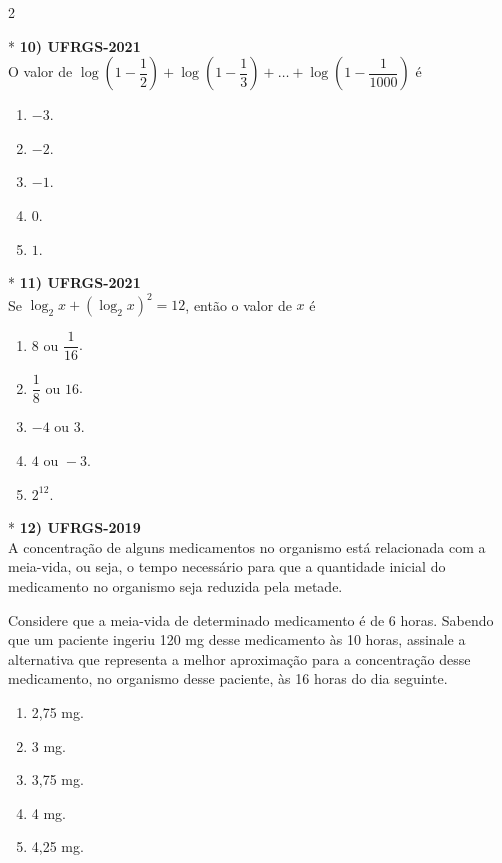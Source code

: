 \documentclass[11pt,a4paper]{article}
\begin{document}
\begin{paracol}{2}
\switchcolumn[1]
\vspace{6cm}

\switchcolumn[0]*
\textbf{10) UFRGS-2021} \\
O valor de $\log\left(1 - \dfrac{1}{2}\right) + \log\left(1 - \dfrac{1}{3}\right) + \dots + \log\left(1 - \dfrac{1}{1000}\right)$ é

\begin{enumerate}[label=(\Alph*)]
    \item $-3$.
    \item $-2$.
    \item $-1$.
    \item $0$.
    \item $1$.
\end{enumerate}
\vspace{0.4cm}

\switchcolumn[1]
\vspace{6cm}

\switchcolumn[0]*
\textbf{11) UFRGS-2021} \\
Se $\log_2 x + (\log_2 x)^2 = 12$, então o valor de $x$ é

\begin{enumerate}[label=(\Alph*), itemsep=0.2cm]
    \item $8 \text{ ou } \dfrac{1}{16}$.
    \item $\dfrac{1}{8} \text{ ou } 16$.
    \item $-4 \text{ ou } 3$.
    \item $4 \text{ ou } -3$.
    \item $2^{12}$.
\end{enumerate}
\vspace{0.4cm}

\switchcolumn[1]
\vspace{6cm}

\switchcolumn[0]*
\textbf{12) UFRGS-2019} \\
A concentração de alguns medicamentos no organismo está relacionada com a meia-vida, ou seja, o tempo necessário para que a quantidade inicial do medicamento no organismo seja reduzida pela metade.

Considere que a meia-vida de determinado medicamento é de 6 horas. Sabendo que um paciente ingeriu 120 mg desse medicamento às 10 horas, assinale a alternativa que representa a melhor aproximação para a concentração desse medicamento, no organismo desse paciente, às 16 horas do dia seguinte.

\begin{enumerate}[label=(\Alph*)]
    \item 2,75 mg.
    \item 3 mg.
    \item 3,75 mg.
    \item 4 mg.
    \item 4,25 mg.
\end{enumerate}
\vspace{0.4cm}


\end{paracol}
\end{document}
